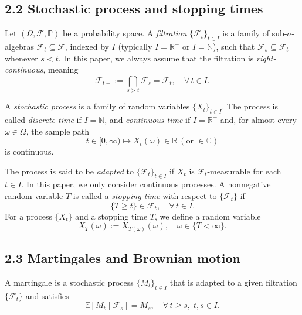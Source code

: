 \documentclass[12pt]{amsart}
\newcommand{\C}{{\mathbb{C}}}
\begin{document}
\subsection*{2.2 Stochastic process and stopping times}

Let $(\Omega,\mathcal{F},\mathbb{P})$ be a probability space. A \emph{filtration} $\{\mathcal{F}_{t}\}_{t \in I}$ is a family of sub-$\sigma$-algebras $\mathcal{F}_{t} \subseteq \mathcal{F}$, indexed by $I$ (typically $I = \mathbb{R}^{+}$ or $I = \mathbb{N}$), such that $\mathcal{F}_{s} \subseteq \mathcal{F}_{t}$ whenever $s < t$. In this paper, we always assume that the filtration is \emph{right-continuous}, meaning 
$$\mathcal{F}_{t+} := \bigcap_{s > t} \mathcal{F}_{s} = \mathcal{F}_{t}, \quad \forall\, t \in I.$$

A \emph{stochastic process} is a family of random variables $\{X_{t}\}_{t \in I}$. The process is called \emph{discrete-time} if $I = \mathbb{N}$, and \emph{continuous-time} if $I = \mathbb{R}^{+}$ and, for almost every $\omega \in \Omega$, the sample path 
$$t\in[0, \infty)  \mapsto X_{t}(\omega)\in \mathbb R\ (\text{or }\in\C) $$
is continuous.

The process is said to be \emph{adapted} to $\{\mathcal{F}_{t}\}_{t \in I}$ if $X_{t}$ is $\mathcal{F}_{t}$-measurable for each $t \in I$.  
In this paper, we only consider continuous processes. A nonnegative random variable $T$ is called a \emph{stopping time} with respect to $\{\mathcal{F}_{t}\}$ if 
$$\{T \geq t\} \in \mathcal{F}_{t}, \quad \forall\, t \in I.$$
For a process $\{X_{t}\}$ and a stopping time $T$, we define a random variable 
$$X_{T}(\omega) := X_{T(\omega)}(\omega), \quad \omega \in \{T < \infty\}.$$

\subsection*{2.3 Martingales and Brownian motion}
A martingale is a stochastic process $\{M_t\}_{t \in I}$ that is adapted to a given filtration $\{\mathcal{F}_t\}$ and satisfies
$$\mathbb{E}[M_t \mid \mathcal{F}_s] = M_s, \quad \forall\, t \geq s, \; t,s \in I.$$
\end{document}
